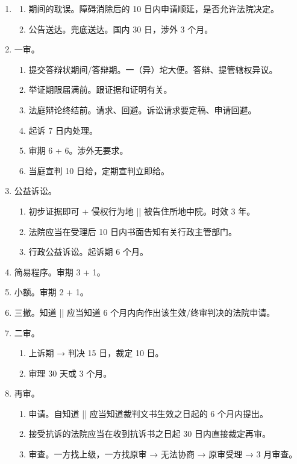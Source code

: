 \begin{enumerate}
  \item \begin{enumerate}
          \item 期间的耽误。障碍消除后的 10 日内申请顺延，是否允许法院决定。
          \item 公告送达。兜底送达。国内 30 日，涉外 3 个月。
        \end{enumerate}
  \item 一审。
        \begin{enumerate}
          \item 提交答辩状期间/答辩期。一（异）坨大便。答辩、提管辖权异议。
          \item 举证期限届满前。跟证据和证明有关。
          \item 法庭辩论终结前。请求、回避。诉讼请求要定稿、申请回避。
          \item 起诉 7 日内处理。
          \item 审期 6 + 6。涉外无要求。
          \item 当庭宣判 10 日给，定期宣判立即给。
        \end{enumerate}
  \item 公益诉讼。
        \begin{enumerate}
          \item 初步证据即可 + 侵权行为地 || 被告住所地中院。时效 3 年。
          \item 法院应当在受理后 10 日内书面告知有关行政主管部门。
          \item 行政公益诉讼。起诉期 6 个月。
        \end{enumerate}
  \item 简易程序。审期 3 + 1。
  \item 小额。审期 2 + 1。
  \item 三撤。知道 || 应当知道 6 个月内向作出该生效/终审判决的法院申请。
  \item 二审。
        \begin{enumerate}
          \item 上诉期 → 判决 15 日，裁定 10 日。
          \item 审理 30 天或 3 个月。
        \end{enumerate}
  \item 再审。
        \begin{enumerate}
          \item 申请。自知道 || 应当知道裁判文书生效之日起的 6 个月内提出。
          \item 接受抗诉的法院应当在收到抗诉书之日起 30 日内直接裁定再审。
          \item 审查。一方找上级，一方找原审 → 无法协商 → 原审受理 → 3 月审查。

\end{enumerate}
\end{enumerate}
